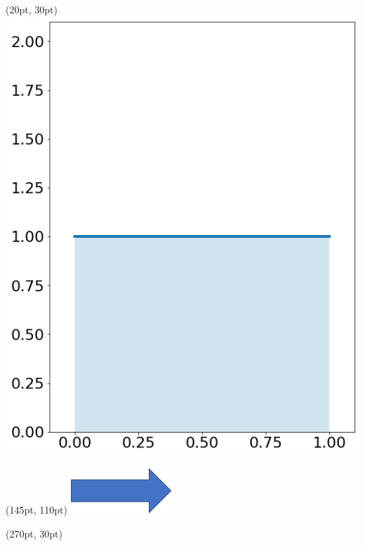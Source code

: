 \documentclass[aspectratio=169,unicode,dvipdfmx,14pt]{beamer}
\begin{document}
\begin{frame}
\begin{textblock*}{0.4\linewidth}(20pt, 30pt)
    \centering
    \includegraphics[width=\linewidth]{beta_1_1.png}
\end{textblock*}
\begin{textblock*}{0.4\linewidth}(145pt, 110pt)
    \centering
    \includegraphics[width=0.3\linewidth]{blue_arrow.png}
\end{textblock*}
\begin{textblock*}{0.4\linewidth}(270pt, 30pt)
    \centering

\end{textblock*}
\end{frame}
\end{document}
